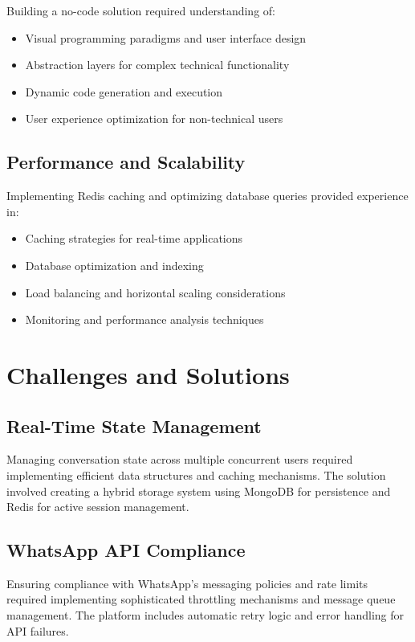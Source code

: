 \documentclass[conference]{IEEEtran}
\begin{document}
Building a no-code solution required understanding of:

\begin{itemize}
\item Visual programming paradigms and user interface design
\item Abstraction layers for complex technical functionality
\item Dynamic code generation and execution
\item User experience optimization for non-technical users
\end{itemize}

\subsection{Performance and Scalability}

Implementing Redis caching and optimizing database queries provided experience in:

\begin{itemize}
\item Caching strategies for real-time applications
\item Database optimization and indexing
\item Load balancing and horizontal scaling considerations
\item Monitoring and performance analysis techniques
\end{itemize}

\section{Challenges and Solutions}

\subsection{Real-Time State Management}

Managing conversation state across multiple concurrent users required implementing efficient data structures and caching mechanisms. The solution involved creating a hybrid storage system using MongoDB for persistence and Redis for active session management.

\subsection{WhatsApp API Compliance}

Ensuring compliance with WhatsApp's messaging policies and rate limits required implementing sophisticated throttling mechanisms and message queue management. The platform includes automatic retry logic and error handling for API failures.
\end{document}
